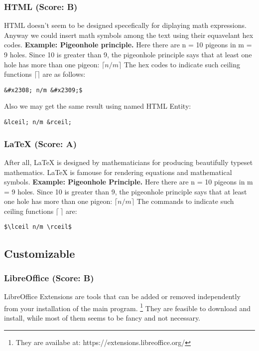 \documentclass[twocolumn]{article}
\begin{document}
\subsubsection{HTML (Score: B)}
HTML doesn't seem to be designed specefically for diplaying math expressions.
Anyway we could insert math symbols among the text using their equavelant hex
codes.
\newline
\textbf{Example: Pigeonhole principle.} Here there are n = 10 pigeons in m = 9
holes. Since 10 is greater than 9, the pigeonhole principle says that at least
one hole has more than one pigeon:
\newline
$⌈n/m⌉$
\newline
The hex codes to indicate such ceiling functions $⌈⌉$ are as follows:
\newline
\begin{verbatim}
&#x2308; n/m &#x2309;$
\end{verbatim}
Also we may get the same result using named HTML Entity:
\newline
\begin{verbatim}
&lceil; n/m &rceil;
\end{verbatim}
\subsubsection{LaTeX (Score: A)}
After all, LaTeX is designed by mathematicians for producing beautifully typeset
mathematics. LaTeX is famouse for rendering equations and mathematical symbols.
\textbf{Example: Pigeonhole Principle.} Here there are n = 10 pigeons in m = 9
holes. Since 10 is greater than 9, the pigeonhole principle says that at least
one hole has more than one pigeon:
$\lceil n/m \rceil$
\newline
The commands to indicate such ceiling functions $\lceil \ \rceil$ are:
\newline
\begin{verbatim}
$\lceil n/m \rceil$
\end{verbatim}
\subsection{Customizable}
\subsubsection{LibreOffice (Score: B)}
LibreOffice Extensions are tools that can be added or removed independently from
your installation of the main program.
\footnote{They are availabe at: https://extensions.libreoffice.org/}
They are feasible to download and install, while most of them seems to be fancy
and not necessary.
\end{document}
